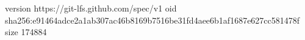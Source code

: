 version https://git-lfs.github.com/spec/v1
oid sha256:e91464adce2a1ab307ac46b8169b7516be31fd4aee6b1af1687e627cc581478f
size 174884
